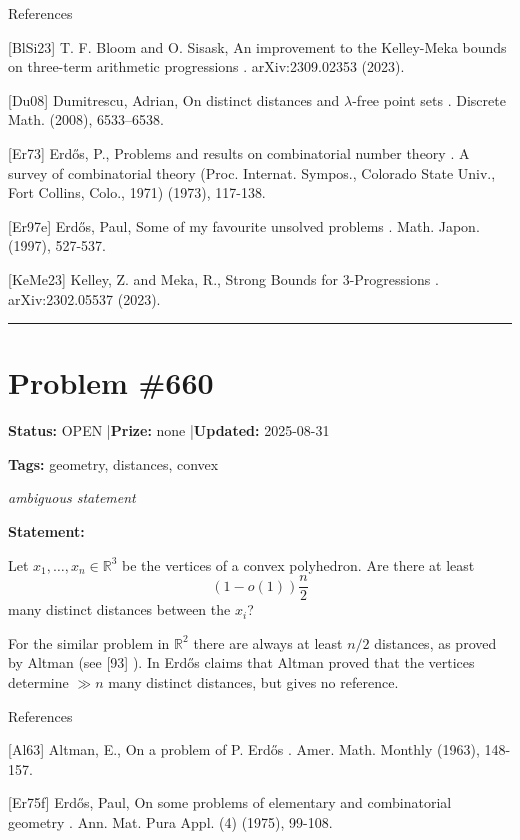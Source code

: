 \documentclass{article}
\begin{document}
References

[BlSi23] T. F. Bloom and O. Sisask, An improvement to the Kelley-Meka bounds on three-term arithmetic progressions . arXiv:2309.02353 (2023).

[Du08] Dumitrescu, Adrian, On distinct distances and {$\lambda$}-free point sets . Discrete Math. (2008), 6533--6538.

[Er73] Erd\H{o}s, P., Problems and results on combinatorial number theory . A survey of combinatorial theory (Proc. Internat. Sympos., Colorado State Univ., Fort Collins, Colo., 1971) (1973), 117-138.

[Er97e] Erd\H{o}s, Paul, Some of my favourite unsolved problems . Math. Japon. (1997), 527-537.

[KeMe23] Kelley, Z. and Meka, R., Strong Bounds for 3-Progressions . arXiv:2302.05537 (2023).

\noindent\rule{\linewidth}{0.4pt}


\section{Problem \#660}
\label{prob:660}

\noindent\textbf{Status:} OPEN \quad|\quad \textbf{Prize:} none \quad|\quad \textbf{Updated:} 2025-08-31

\noindent\textbf{Tags:} geometry, distances, convex

\medskip
\noindent\textit{ambiguous statement}


\noindent\textbf{Statement:}

Let $x_1,\ldots,x_n\in \mathbb{R}^3$ be the vertices of a convex polyhedron. Are there at least\[(1-o(1))\frac{n}{2}\]many distinct distances between the $x_i$?




For the similar problem in $\mathbb{R}^2$ there are always at least $n/2$ distances, as proved by Altman \cite{Al63} (see [93] ). In \cite{Er75f} Erd\H{o}s claims that Altman proved that the vertices determine $\gg n$ many distinct distances, but gives no reference.




References

[Al63] Altman, E., On a problem of P. Erd\H{o}s . Amer. Math. Monthly (1963), 148-157.

[Er75f] Erd\H{o}s, Paul, On some problems of elementary and combinatorial geometry . Ann. Mat. Pura Appl. (4) (1975), 99-108.
\end{document}
